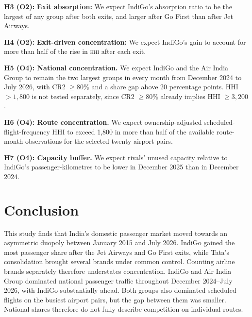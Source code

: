 \documentclass[12pt,a4paper]{article}
\newenvironment{authorcontribution}[1]{\par\begingroup\color{#1}}{\par\endgroup}
\newcommand{\HHI}{\textsc{hhi}}
\begin{document}
\begin{authorcontribution}{authorMeena}
\textbf{H3 (O2):} \textbf{Exit absorption:} We expect IndiGo's absorption ratio to be the largest of any group after both exits, and larger after Go First than after Jet Airways.

\textbf{H4 (O2):} \textbf{Exit-driven concentration:} We expect IndiGo's gain to account for more than half of the rise in \HHI{} after each exit.
\end{authorcontribution}

\begin{authorcontribution}{authorGoutham}
\textbf{H5 (O4): National concentration.} We expect IndiGo and the Air India Group to remain the two largest groups in every month from December 2024 to July 2026, with CR2 $\geq80\%$ and a share gap above 20 percentage points. HHI $>1{,}800$ is not tested separately, since CR2 $\geq80\%$ already implies HHI $\geq3{,}200$.

\textbf{H6 (O4): Route concentration.} We expect ownership-adjusted scheduled-flight-frequency HHI to exceed 1,800 in more than half of the available route-month observations for the selected twenty airport pairs.

\textbf{H7 (O4): Capacity buffer.} We expect rivals' unused capacity relative to IndiGo's passenger-kilometres to be lower in December 2025 than in December 2024.
\end{authorcontribution}
\endgroup







\section{Conclusion}
This study finds that India's domestic passenger market moved towards an asymmetric duopoly between January 2015 and July 2026. IndiGo gained the most passenger share after the Jet Airways and Go First exits, while Tata's consolidation brought several brands under common control. Counting airline brands separately therefore understates concentration. IndiGo and Air India Group dominated national passenger traffic throughout December 2024--July 2026, with IndiGo substantially ahead. Both groups also dominated scheduled flights on the busiest airport pairs, but the gap between them was smaller. National shares therefore do not fully describe competition on individual routes.
\end{document}
